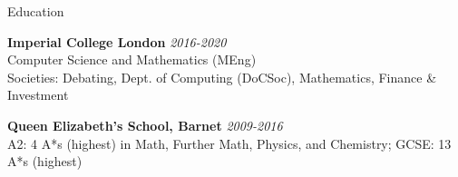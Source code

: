\documentclass[10pt]{resume} %
\begin{document}

\begin{rSection}{Education}

{\bf Imperial College London} \hfill {\em 2016-2020} \\ 
Computer Science and Mathematics (MEng)\smallskip\\
Societies: Debating, Dept. of Computing (DoCSoc), Mathematics, Finance \& Investment

{\bf Queen Elizabeth's School, Barnet} \hfill {\em 2009-2016} \\ 
A2: 4 A*s (highest) in Math, Further Math, Physics, and Chemistry; GCSE: 13 A*s (highest)

\end{rSection}

\end{document}
